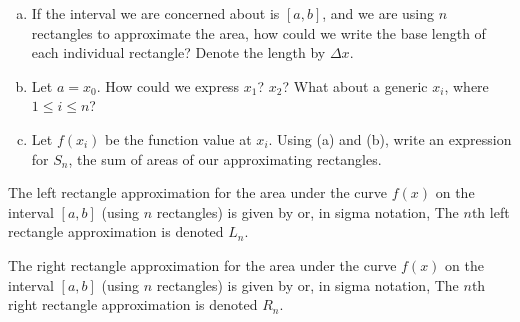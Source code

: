 \documentclass[notes]{subfiles}
\begin{document}
		\begin{question}$ $
			\begin{enumerate}[(a)]
				\item If the interval we are concerned about is $[a,b]$, and we are using $n$ rectangles to approximate the area, how could we write the base length of each individual rectangle?  Denote the length by $\Delta x$.
					
				\item Let $a = x_0$.  How could we express $x_1$?  $x_2$?  What about a generic $x_i$, where $1\leq i\leq n$?
					
				\item Let $f(x_i)$ be the function value at $x_i$.  Using (a) and (b), write an expression for $S_n$, the sum of areas of our approximating rectangles.
			\end{enumerate}
		\end{question}
				\newpage
			
		\begin{rmk}
			The left rectangle approximation for the area under the curve $f(x)$ on the interval $[a,b]$ (using $n$ rectangles) is given by
			or, in sigma notation,
			The $n$th left rectangle approximation is denoted $L_n$.
		\end{rmk}

		\begin{rmk}
			The right rectangle approximation for the area under the curve $f(x)$ on the interval $[a,b]$ (using $n$ rectangles) is given by
			or, in sigma notation,
			The $n$th right rectangle approximation is denoted $R_n$.
		\end{rmk}
		
\end{document}

